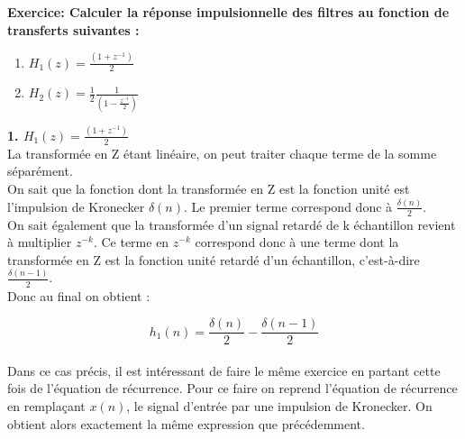 \documentclass[11pt,a4paper]{article}
\begin{document}
\textbf{Exercice: Calculer la réponse impulsionnelle des filtres au fonction de transferts suivantes :}
\begin{enumerate}
\item  $H_1(z) = \frac{(1 + z^{-1})}{2}$
\item  $H_2(z) = \frac{1}{2}\frac{1}{(1 - \frac{z^{-1}}{2})}$
\end{enumerate}

\textbf{1. $H_1(z) = \frac{(1 + z^{-1})}{2}$}\\

La transformée en Z étant linéaire, on peut traiter chaque terme de la somme séparément.\\

On sait que la fonction dont la transformée en Z est la fonction unité est l'impulsion de Kronecker $\delta(n)$. Le premier terme correspond donc à $\frac{\delta(n)}{2}$.\\

On sait également que la transformée d'un signal retardé de k échantillon revient à multiplier $ z^{-k}$. Ce terme en $ z^{-k}$ correspond donc à une terme dont la transformée en Z est la fonction unité retardé d'un échantillon, c'est-à-dire $\frac{\delta(n-1)}{2}$.\\

Donc au final on obtient : 

\[h_1(n) = \frac{\delta(n)}{2} - \frac{\delta(n-1)}{2}\]\\

Dans ce cas précis, il est intéressant de faire le même exercice en partant cette fois de l'équation de récurrence. Pour ce faire on reprend l'équation de récurrence en remplaçant $x(n)$, le signal d'entrée par une impulsion de Kronecker. On obtient alors exactement la même expression que précédemment.\\ 

\begin{center}
\end{center}
\end{document}
